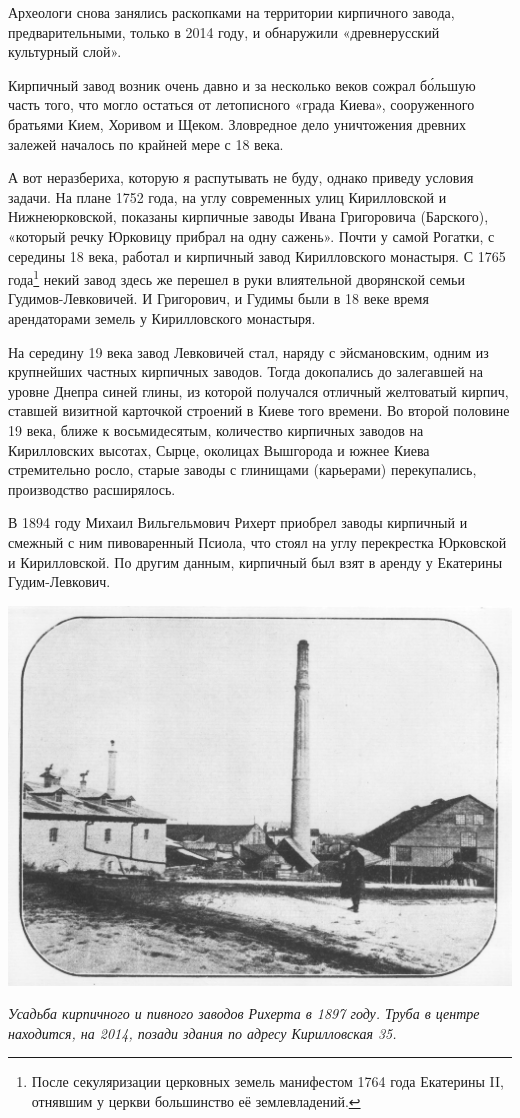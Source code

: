 Археологи снова занялись раскопками на территории кирпичного завода, предварительными, только в 2014 году, и обнаружили «древнерусский культурный слой».

Кирпичный завод возник очень давно и за несколько веков сожрал б\'ольшую часть того, что могло остаться от летописного «града Киева», сооруженного братьями Кием, Хоривом и Щеком. Зловредное дело уничтожения древних залежей началось по крайней мере с 18 века.

А вот неразбериха, которую я распутывать не буду, однако приведу условия задачи. На плане 1752 года, на углу современных улиц Кирилловской и Нижнеюрковской, показаны кирпичные заводы Ивана Григоровича (Барского), «который речку Юрковицу прибрал на одну сажень». Почти у самой Рогатки, с середины 18 века, работал и кирпичный завод Кирилловского монастыря. С 1765 года\footnote{После секуляризации церковных земель манифестом 1764 года Екатерины II, отнявшим у церкви большинство её землевладений.} некий завод здесь же перешел в руки влиятельной дворянской семьи Гудимов-Левковичей. И Григорович, и Гудимы были в 18 веке время арендаторами земель у Кирилловского монастыря.

На середину 19 века завод Левковичей стал, наряду с эйсмановским, одним из крупнейших частных кирпичных заводов. Тогда докопались до залегавшей на уровне Днепра синей глины, из которой получался отличный желтоватый кирпич, ставшей визитной карточкой строений в Киеве того времени. Во второй половине 19 века, ближе к восьмидесятым, количество кирпичных заводов на Кирилловских высотах, Сырце, околицах Вышгорода и южнее Киева стремительно росло, старые заводы с глинищами (карьерами) перекупались, производство расширялось.

В 1894 году Михаил Вильгельмович Рихерт приобрел заводы кирпичный и смежный с ним пивоваренный Псиола, что стоял на углу перекрестка Юрковской и Кирилловской. По другим данным, кирпичный был взят в аренду у Екатерины Гудим-Левкович.

\begin{center}
\includegraphics[width=\linewidth]{chast-kirvys/lys02/1897-rihert-kirp.jpg}

\textit{Усадьба кирпичного и пивного заводов Рихерта в 1897 году. Труба в центре находится, на 2014, позади здания по адресу Кирилловская 35.}
\end{center}


